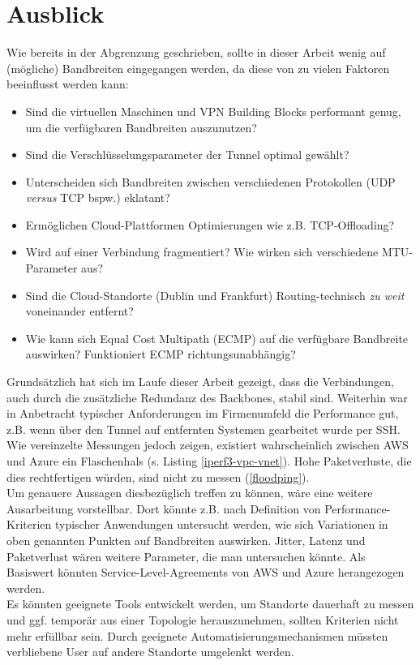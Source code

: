 \section{Ausblick}\label{ausblick}
Wie bereits in der Abgrenzung geschrieben, sollte in dieser Arbeit wenig auf (mögliche) Bandbreiten eingegangen werden, da diese von zu vielen Faktoren beeinflusst werden kann:
\begin{itemize}
    \item Sind die virtuellen Maschinen und VPN Building Blocks performant genug, um die verfügbaren Bandbreiten auszunutzen?
    \item Sind die Verschlüsselungsparameter der Tunnel optimal gewählt?
    \item Unterscheiden sich Bandbreiten zwischen verschiedenen Protokollen (UDP \textit{versus} TCP bspw.) eklatant?
    \item Ermöglichen Cloud-Plattformen Optimierungen wie z.B. TCP-Offloading?
    \item Wird auf einer Verbindung fragmentiert? Wie wirken sich verschiedene MTU-Parameter aus?
    \item Sind die Cloud-Standorte (Dublin und Frankfurt) Routing-technisch \textit{zu weit} voneinander entfernt?
    \item Wie kann sich Equal Cost Multipath (ECMP) auf die verfügbare Bandbreite auswirken? Funktioniert ECMP richtungsunabhängig?
\end{itemize}
Grundsätzlich hat sich im Laufe dieser Arbeit gezeigt, dass die Verbindungen, auch durch die zusätzliche Redundanz des Backbones, stabil sind. Weiterhin war in Anbetracht typischer Anforderungen im Firmenumfeld die Performance gut, z.B. wenn über den Tunnel auf entfernten Systemen gearbeitet wurde per SSH. Wie vereinzelte Messungen jedoch zeigen, existiert wahrscheinlich zwischen AWS und Azure ein Flaschenhals (s. Listing \ref{iperf3-vpc-vnet}). Hohe Paketverluste, die dies rechtfertigen würden, sind nicht zu messen (\ref{floodping}).\\
Um genauere Aussagen diesbezüglich treffen zu können, wäre eine weitere Ausarbeitung vorstellbar. Dort könnte z.B. nach Definition von Performance-Kriterien typischer Anwendungen untersucht werden, wie sich Variationen in oben genannten Punkten auf Bandbreiten auswirken. Jitter, Latenz und Paketverlust wären weitere Parameter, die man untersuchen könnte. Als Basiswert könnten Service-Level-Agreements von AWS und Azure herangezogen werden.\\
Es könnten geeignete Tools entwickelt werden, um Standorte dauerhaft zu messen und ggf. temporär aus einer Topologie herauszunehmen, sollten Kriterien nicht mehr erfüllbar sein. Durch geeignete Automatisierungsmechanismen müssten verbliebene User auf andere Standorte \glqq umgelenkt\grqq{} werden.\\
